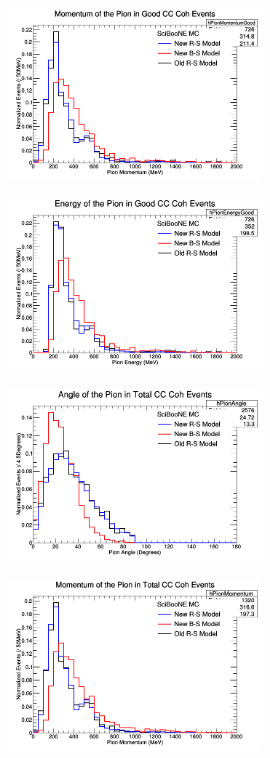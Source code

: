 \documentclass[11pt]{article}
\begin{document}
\begin{figure}[H]
\centering
\includegraphics[width=0.6\textwidth]{NMPionPlottingImages/8-NMPionPlotting.png}
\caption{}
\end{figure}

\begin{figure}[H]
\centering
\includegraphics[width=0.6\textwidth]{NMPionPlottingImages/9-NMPionPlotting.png}
\caption{}
\end{figure}

\begin{figure}[H]
\centering
\includegraphics[width=0.6\textwidth]{NMPionPlottingImages/10-NMPionPlotting.png}
\caption{}
\end{figure}

\begin{figure}[H]
\centering
\includegraphics[width=0.6\textwidth]{NMPionPlottingImages/11-NMPionPlotting.png}
\caption{}
\end{figure}
\end{document}
